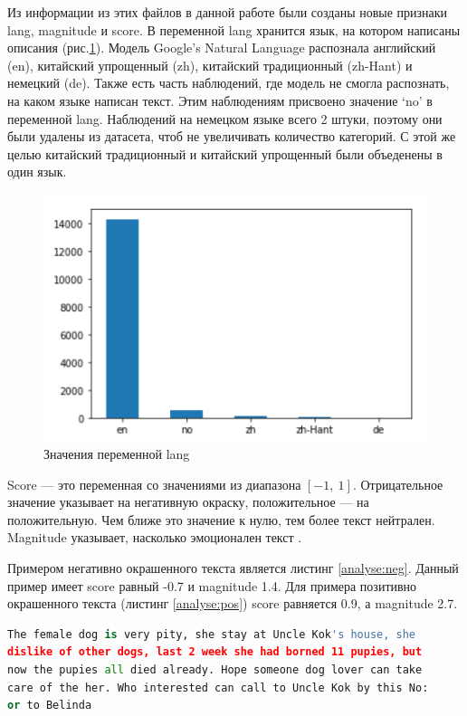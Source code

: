 \documentclass[14pt]{mmcs_article}
\begin{document}
Из информации из этих файлов в данной работе были созданы новые признаки lang, magnitude и score. В переменной lang хранится язык, на котором написаны описания (рис.\ref{analyse:lang}). Модель Google’s Natural Language распознала английский (en), китайский упрощенный (zh), китайский традиционный (zh-Hant) и немецкий (de). Также есть часть наблюдений, где модель не смогла распознать, на каком языке написан текст. Этим наблюдениям присвоено значение `no' в переменной lang. Наблюдений на немецком языке всего 2 штуки, поэтому они были удалены из датасета, чтоб не увеличивать количество категорий. С этой же целью китайский традиционный и китайский упрощенный были объеденены в один язык. 

\begin{figure}[H]
	\centering
	\includegraphics[scale=1.2]{lang.png}
	\caption{Значения переменной lang}\label{analyse:lang}
\end{figure}

Score --- это переменная со значениями из диапазона $[-1,\ 1]$. Отрицательное значение указывает на негативную окраску, положительное --- на положительную. Чем ближе это значение к нулю, тем более текст нейтрален. Magnitude указывает, насколько эмоционален текст \cite{lib:googlelang}.

Примером негативно окрашенного текста является листинг \ref{analyse:neg}. Данный пример имеет score равный -0.7 и magnitude 1.4. Для примера позитивно окрашенного текста (листинг \ref{analyse:pos}) score равняется 0.9, а magnitude 2.7. 

\begin{lstlisting}[language=Python, caption={Пример негативно окрашенного текста}, label=analyse:neg]
The female dog is very pity, she stay at Uncle Kok's house, she 
dislike of other dogs, last 2 week she had borned 11 pupies, but 
now the pupies all died already. Hope someone dog lover can take 
care of the her. Who interested can call to Uncle Kok by this No: 
or to Belinda
\end{lstlisting}
\end{document}
